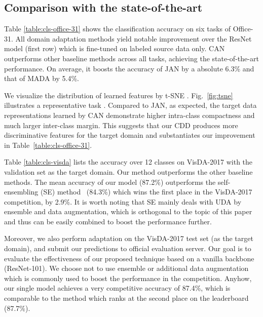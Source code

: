 \documentclass[10pt,twocolumn,letterpaper]{article}
\begin{document}
\subsection{Comparison with the state-of-the-art}\label{sec:soa}
Table \ref{table:cls-office-31} shows the classification accuracy on six tasks of Office-31. 
All domain adaptation methods yield notable improvement over the ResNet model (first row) which is fine-tuned on labeled source data only. CAN outperforms other baseline methods across all tasks, achieving the state-of-the-art performance. On average, it boosts the accuracy of JAN by a absolute 6.3\% and that of MADA by 5.4\%.


We visualize the distribution of learned features by t-SNE \cite{maaten2008visualizing}. Fig.~\ref{fig:tsne} illustrates a representative task .
Compared to JAN,
as expected, the target data representations learned by CAN
demonstrate higher intra-class compactness 
and much larger inter-class margin. 
This suggests that our CDD produces more discriminative features for the target domain and substantiates our improvement in Table~\ref{table:cls-office-31}. 


Table \ref{table:cls-visda} lists the accuracy over 12 classes on VisDA-2017 with the validation set as the target domain. 
Our method outperforms the other baseline methods.
The mean accuracy of our model (87.2\%) outperforms
the self-ensembling (SE) method~\cite{french2017self} (84.3\%)
which wins the first place in the VisDA-2017 competition, by 2.9\%.
It is worth noting that SE mainly deals with UDA by ensemble and data augmentation,
which is orthogonal to the topic of this paper and thus can be easily combined to boost the performance further.

Moreover, we also perform adaptation on the VisDA-2017 test set (as the target
domain), and submit our predictions to official evaluation server. Our goal is to evaluate the effectiveness of our proposed technique based on a vanilla backbone (ResNet-101). We choose not to use ensemble or additional data augmentation which is commonly used to boost the performance in the competition.
Anyhow, our single model achieves a very competitive accuracy of 87.4\%, which 
is comparable to the method which ranks at the second place on the leaderboard (87.7\%).
\end{document}
